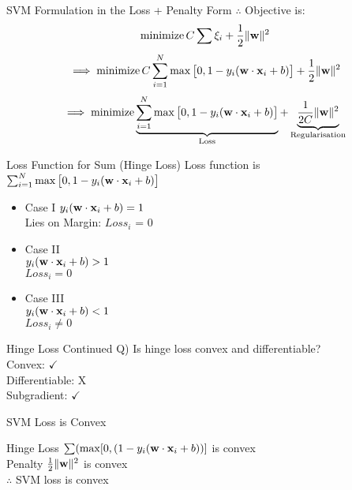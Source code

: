 \documentclass{beamer}
\begin{document}
	\begin{frame}{SVM Formulation in the Loss + Penalty Form}
		$\therefore$ Objective is:
		$$\operatorname{minimize} C \sum \xi_{i} + \frac{1}{2}\|\mathbf{w}\|^{2}$$
		$$\implies \operatorname{minimize} C \sum_{i=1}^{N} \max\big[0, 1 - y_{i}(\mathbf{w} \cdot \mathbf{x}_{i} + b)\big] + \frac{1}{2}\|\mathbf{w}\|^{2}$$
		$$\implies \operatorname{minimize} \underbrace{\sum_{i=1}^{N}\max \big[0, 1-y_{i}(\mathbf{w} \cdot \mathbf{x}_{i} + b)\big]}_\text{Loss} + \underbrace{ \frac{1}{2C}\|\mathbf{w}\|^{2}}_\text{Regularisation}$$
	\end{frame}

{
	
}

	\begin{frame}{Loss Function for Sum (Hinge Loss)}
		Loss function is $\sum_{i=1}^{N}\max\big[0, 1 - y_{i}(\mathbf{w} \cdot \mathbf{x}_{i} + b)\big]$ \\
		\begin{itemize}
\item Case I 
			\hspace{0.5cm} $y_{i}(\mathbf{w} \cdot \mathbf{x}_{i} + b) = 1$ \\
			
			Lies on Margin: $Loss_{i}$ = 0 \\
		
			\item Case II \\
			\hspace{0.5cm} $y_{i}(\mathbf{w} \cdot \mathbf{x}_{i} + b) > 1$ \\
			$Loss_{i} = 0$ \\ 
			
			\pause
\item Case III \\
			\hspace{0.5cm} $y_{i}(\mathbf{w} \cdot \mathbf{x}_{i} + b) < 1$ \\
			$Loss_{i} \neq 0$
		\end{itemize}

	\end{frame}
	\begin{frame}{Hinge Loss Continued}
		Q) Is hinge loss convex and differentiable? \\
		\hspace{0.5cm}Convex: $\checkmark$ \\
		\hspace{0.5cm}Differentiable: X\\
		\hspace{0.5cm}Subgradient: $\checkmark$
	\end{frame}
	\begin{frame}{SVM Loss is Convex}
		
		Hinge Loss $\sum(\max[0, (1-y_{i}(\mathbf{w} \cdot \mathbf{x}_{i}+b))]$ is convex \\
		\vspace{1cm}
		Penalty $\frac{1}{2}\|\mathbf{w}\|^{2}$ is convex \\
		\vspace{1cm}
		$\therefore$ SVM loss is convex
	\end{frame}
	
\end{document}
